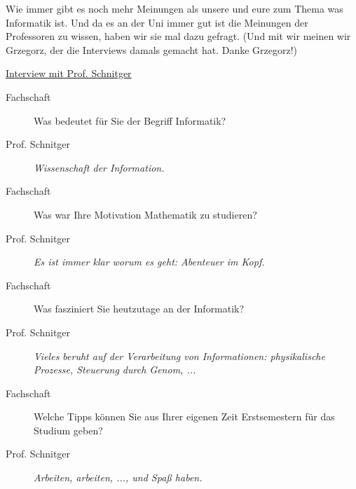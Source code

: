 \spaltenanfang
Wie immer gibt es noch mehr Meinungen als unsere und eure zum Thema was Informatik ist.
Und da es an der Uni immer gut ist die Meinungen der Professoren zu wissen, haben wir sie mal dazu gefragt.
(Und mit wir meinen wir Grzegorz, der die Interviews damals gemacht hat. Danke Grzegorz!)

\begin{flushleft}\underline{Interview mit Prof. Schnitger} \end{flushleft}

\begin{description}

\item[Fachschaft] 

Was bedeutet für Sie der Begriff Informatik?

\item[Prof. Schnitger]
 
\textit{Wissenschaft der Information.}

\item[Fachschaft]

Was war Ihre Motivation Mathematik zu studieren?

\item[Prof. Schnitger]

\textit{Es ist immer klar worum es geht: Abenteuer im Kopf.}

\item[Fachschaft]

Was fasziniert Sie heutzutage an der Informatik?

\item[Prof. Schnitger]

\textit{Vieles beruht auf der Verarbeitung von Informationen: physikalische Prozesse, Steuerung durch Genom, ...}

\item[Fachschaft]

Welche Tipps können Sie aus Ihrer eigenen Zeit Erstsemestern für das Studium geben?

\item[Prof. Schnitger]

\textit{Arbeiten, arbeiten, ..., und Spaß haben.}

\end{description}
